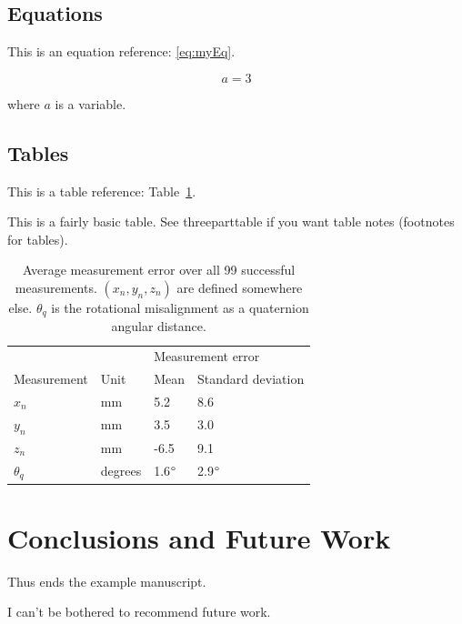 \documentclass[preprint,3p,11pt,sort]{elsarticle}
\newcommand{\tbref}[1]{Table~\ref{#1}}
\begin{document}
\subsection{Equations}
This is an equation reference: \eqref{eq:myEq}.

\begin{equation} \label{eq:myEq}
    a = 3
\end{equation}

where $a$ is a variable.


\subsection{Tables}
This is a table reference: \tbref{tb:myTable}.

This is a fairly basic table. See threeparttable if you want table notes (footnotes for tables).

\begin{table}[!h]
    \centering
    \begin{tabular}{llll}
        \hline
        & & \multicolumn{2}{l}{Measurement error}\\
        Measurement & Unit & Mean & Standard deviation\\
        \hline
        $x_n$ & mm & 5.2 & 8.6\\
        $y_n$ & mm & 3.5 & 3.0\\
        $z_n$ & mm & -6.5 & 9.1\\
        $\theta_q$ & degrees & 1.6$\degree$ & 2.9$\degree$\\
        \hline
        \end{tabular}
    \caption{Average measurement error over all 99 successful measurements. $(x_n, y_n, z_n)$ are defined somewhere else. $\theta_q$ is the rotational misalignment as a quaternion angular distance.}
    \label{tb:myTable}
\end{table}


\section{Conclusions and Future Work} \label{sec:conclusions}
Thus ends the example manuscript.

I can't be bothered to recommend future work.


\FloatBarrier



\end{document}
